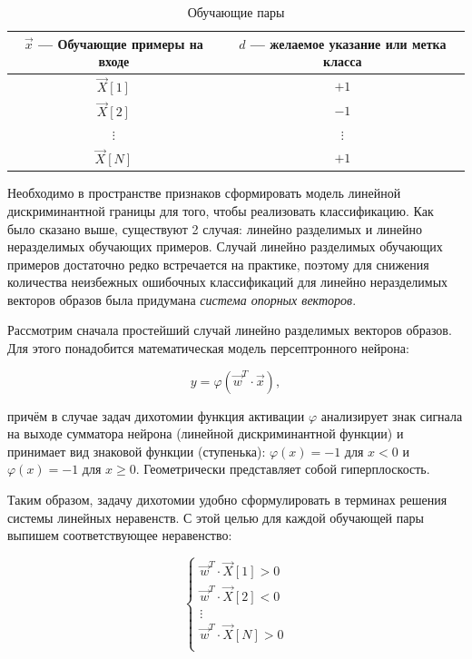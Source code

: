 \documentclass{article}
\numberwithin{equation}{subsection}
\begin{document}
\begin{table}[htbp]
    \centering
    \begin{tabular}{c | c}
        $\vec{x}$ --- Обучающие примеры на входе & $d$ --- желаемое указание или метка класса \\\hline
        $\vec{X}[1]$                             & $+1$ \\\hline
        $\vec{X}[2]$                             & $-1$ \\\hline
        $\vdots$                                 & $\vdots$ \\\hline
        $\vec{X}[N]$                             & $+1$ \\\hline
        
    \end{tabular}
    \caption{Обучающие пары}
    \label{table:learn_pairs}
\end{table}

Необходимо в пространстве признаков сформировать модель линейной дискриминантной
границы для того, чтобы реализовать классификацию. Как было сказано выше, существуют
2 случая: линейно разделимых и линейно неразделимых обучающих примеров.
Случай линейно разделимых обучающих примеров достаточно редко встречается
на практике, поэтому для снижения количества неизбежных ошибочных классификаций
для линейно неразделимых векторов образов была придумана \textit{система опорных векторов}.

Рассмотрим сначала простейший случай линейно разделимых векторов образов. Для этого 
понадобится математическая модель персептронного нейрона:

\begin{equation}
    y = \varphi(\vec{w}^T \cdot \vec{x}),
\end{equation}

\noindent
причём в случае задач дихотомии функция активации $\varphi$ анализирует знак сигнала 
на выходе сумматора нейрона (линейной дискриминантной функции) и принимает вид знаковой
функции (\glqq ступенька\grqq): $\varphi(x)=-1$ для $x<0$ и $\varphi(x)=-1$ для 
$x\geqslant0$. Геометрически представляет собой гиперплоскость.

Таким образом, задачу дихотомии удобно сформулировать в терминах решения системы линейных
неравенств. С этой целью для каждой обучающей пары выпишем соответствующее неравенство:

\begin{equation}
    \begin{cases}
        \vec{w}^T \cdot \vec{X}[1] > 0 \\
        \vec{w}^T \cdot \vec{X}[2] < 0 \\
        \vdots \\
        \vec{w}^T \cdot \vec{X}[N] > 0 \\
    \end{cases}
\end{equation}
\end{document}
